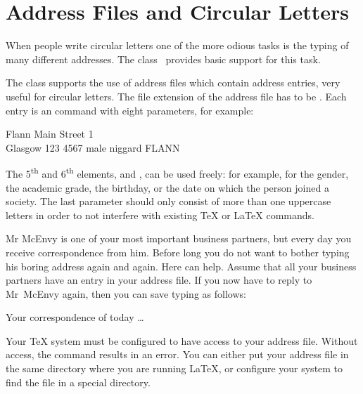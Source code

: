 %
\EndIndexGroup
%
\EndIndexGroup


\section{Address Files and Circular Letters}
%
\BeginIndexGroup
{}%
%
%

When people write circular letters one of the more odious tasks is the typing
of many different addresses.  The class %
\iffalse%
, as did its predecessor \Class{scrlettr} as well,%
\fi%
\ provides basic support for this task.%
\iffalse%
\ Currently there are plans for much enhanced support.%
\fi

\begin{Declaration}
\end{Declaration}%
The class  supports the use of address files which
contain address entries, very useful for circular letters. The file
extension of the address file has to be . Each entry is an
 command with eight parameters, for example:
\begin{lstcode}
           {Flann}
           {Main Street 1\\ Glasgow}
           {123 4567}
           {male}
           {}
           {niggard}
           {FLANN}
\end{lstcode}
The 5\textsuperscript{th} and 6\textsuperscript{th} elements,  and
, can be used freely: for example, for the gender, the academic
grade, the birthday, or the date on which the person joined a society.  The
last parameter  should only consist of more than one uppercase
letters in order to not interfere with existing {\TeX} or {\LaTeX} commands.

\begin{Example}
  Mr McEnvy is one of your most important business partners, but
  every day you receive correspondence from him.  Before long you do
  not want to bother typing his boring address again and again.  Here
   can help.  Assume that all your business partners
  have an entry in your  address file.  If you now
  have to reply to Mr~McEnvy again, then you can save typing as
  follows:
  \begin{lstcode}
    
    \begin{letter}{\FLANN}
      Your correspondence of today \dots
    \end{letter}
  \end{lstcode}
  Your {\TeX} system must be configured to have access to your address
  file. Without access, the  command results in an
  error. You can either put your address file in the same directory
  where you are running {\LaTeX}, or configure your system to find the
  file in a special directory.
\end{Example}
% 
\EndIndexGroup

